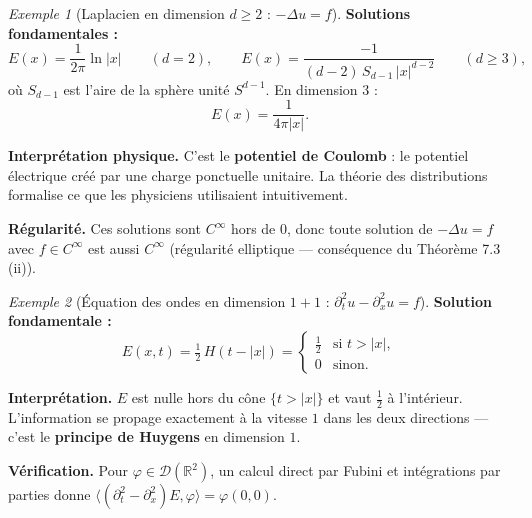 \documentclass[12pt,a4paper,openany]{book}
\theoremstyle{definition}
\theoremstyle{plain}
\theoremstyle{remark}
\newtheorem*{example}{Exemple}
\begin{document}
	\begin{example}[Laplacien en dimension $d \geq 2$ : $-\Delta u = f$]
		\textbf{Solutions fondamentales :}
		\[
		E(x) = \frac{1}{2\pi}\ln|x| \qquad (d = 2),
		\qquad
		E(x) = \frac{-1}{(d-2)\,S_{d-1}\,|x|^{d-2}} \qquad (d \geq 3),
		\]
		où $S_{d-1}$ est l'aire de la sphère unité $S^{d-1}$. En dimension $3$ :
		\[
		E(x) = \frac{1}{4\pi|x|}.
		\]
		
		\textbf{Interprétation physique.} C'est le \textbf{potentiel de Coulomb} : le
		potentiel électrique créé par une charge ponctuelle unitaire. La théorie des
		distributions formalise ce que les physiciens utilisaient intuitivement.
		
		\medskip
		\textbf{Régularité.} Ces solutions sont $C^\infty$ hors de $0$, donc toute
		solution de $-\Delta u = f$ avec $f \in C^\infty$ est aussi $C^\infty$
		(régularité elliptique — conséquence du Théorème 7.3\,(ii)).
	\end{example}
	
	\begin{example}[Équation des ondes en dimension $1+1$ : $\partial_t^2 u - \partial_x^2 u = f$]
		\textbf{Solution fondamentale :}
		\[
		E(x,t) = \tfrac{1}{2}\,H(t - |x|)
		= \begin{cases} \tfrac{1}{2} & \text{si } t > |x|, \\ 0 & \text{sinon.} \end{cases}
		\]
		
		\textbf{Interprétation.} $E$ est nulle hors du cône $\{t > |x|\}$ et vaut $\tfrac{1}{2}$
		à l'intérieur. L'information se propage exactement à la vitesse $1$ dans les deux
		directions — c'est le \textbf{principe de Huygens} en dimension $1$.
		
		\medskip
		\textbf{Vérification.} Pour $\varphi \in \mathcal{D}(\mathbb{R}^2)$, un calcul direct par
		Fubini et intégrations par parties donne
		$\langle (\partial_t^2 - \partial_x^2)E, \varphi \rangle = \varphi(0,0)$.
	\end{example}
	
\end{document}
